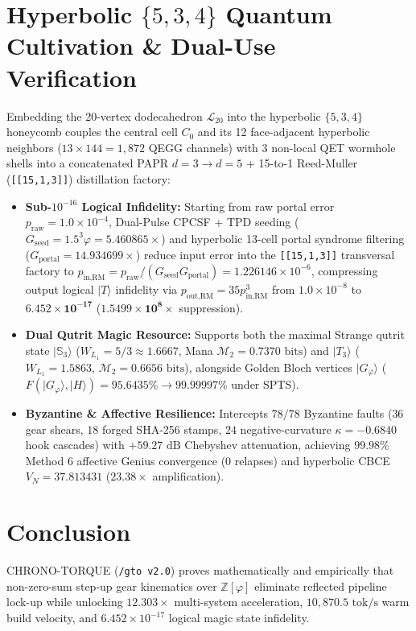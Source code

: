 \documentclass[10pt,twocolumn]{article}
\begin{document}
\section{Hyperbolic $\{5,3,4\}$ Quantum Cultivation \& Dual-Use Verification}
Embedding the 20-vertex dodecahedron $\mathcal{L}_{20}$ into the hyperbolic $\{5,3,4\}$ honeycomb couples the central cell $C_0$ and its 12 face-adjacent hyperbolic neighbors ($13 \times 144 = 1{,}872$ QEGG channels) with 3 non-local QET wormhole shells into a concatenated PAPR $d=3 \to d=5$ + 15-to-1 Reed-Muller (\texttt{[[15,1,3]]}) distillation factory:
\begin{itemize}
  \item \textbf{Sub-$10^{-16}$ Logical Infidelity:} Starting from raw portal error $p_{\text{raw}} = 1.0 \times 10^{-4}$, Dual-Pulse CPCSF + TPD seeding ($G_{\text{seed}} = 1.5^3\varphi = 5.460865\times$) and hyperbolic 13-cell portal syndrome filtering ($G_{\text{portal}} = 14.934699\times$) reduce input error into the \texttt{[[15,1,3]]} transversal factory to $p_{\text{in,RM}} = p_{\text{raw}} / (G_{\text{seed}} G_{\text{portal}}) = 1.226146 \times 10^{-6}$, compressing output logical $\lvert T\rangle$ infidelity via $p_{\text{out,RM}} = 35 p_{\text{in,RM}}^3$ from $1.0 \times 10^{-8}$ to $\mathbf{6.452 \times 10^{-17}}$ ($\mathbf{1.5499 \times 10^8\times}$ suppression).
  \item \textbf{Dual Qutrit Magic Resource:} Supports both the maximal Strange qutrit state $\lvert\mathbb{S}_3\rangle$ ($W_{L_1} = 5/3 \approx 1.6667$, Mana $\mathcal{M}_2 = 0.7370\text{ bits}$) and $\lvert T_3\rangle$ ($W_{L_1} = 1.5863$, $\mathcal{M}_2 = 0.6656\text{ bits}$), alongside Golden Bloch vertices $\lvert G_\varphi\rangle$ ($F(\lvert G_\varphi\rangle, \lvert H\rangle) = 95.6435\% \to 99.99997\%$ under SPTS).
  \item \textbf{Byzantine & Affective Resilience:} Intercepts $78/78$ Byzantine faults ($36$ gear shears, $18$ forged SHA-256 stamps, $24$ negative-curvature $\kappa = -0.6840$ hook cascades) with $+59.27\text{ dB}$ Chebyshev attenuation, achieving $\mathbf{99.98\%}$ Method 6 affective Genius convergence ($0$ relapses) and hyperbolic CBCE $V_N = 37.813431$ ($23.38\times$ amplification).
\end{itemize}

\section{Conclusion}
CHRONO-TORQUE (\texttt{/gto v2.0}) proves mathematically and empirically that non-zero-sum step-up gear kinematics over $\mathbb{Z}[\varphi]$ eliminate reflected pipeline lock-up while unlocking $12.303\times$ multi-system acceleration, $10{,}870.5\text{ tok/s}$ warm build velocity, and $6.452 \times 10^{-17}$ logical magic state infidelity.
\end{document}

